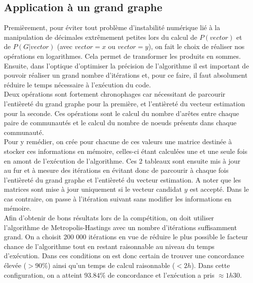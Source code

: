\documentclass[a4paper, 11pt]{article}
\begin{document}
\newpage

\subsection{Application à un grand graphe}
Premièrement, pour éviter tout problème d'instabilité numérique lié à la manipulation de décimales extrêmement petites lors du calcul de $P(vector)$ et de $P(G|vector)$ (avec $vector = x$ ou $vector = y$), on fait le choix de réaliser nos opérations en logarithmes. Cela permet de transformer les produits en sommes.\\

Ensuite, dans l'optique d'optimiser la précision de l'algorithme il est important de pouvoir réaliser un grand nombre d'itérations et, pour ce faire, il faut absolument réduire le temps nécessaire à l'exécution du code.\\

Deux opérations sont fortement chronophages car nécessitant de parcourir l'entièreté du grand graphe pour la première, et l'entièreté du vecteur estimation pour la seconde. Ces opérations sont  le calcul du nombre d'arêtes entre chaque paire de communautés et le calcul du nombre de noeuds présents dans chaque communauté.\\

Pour y remédier, on crée pour chacune de ces valeurs une matrice destinée à stocker ces informations en mémoire, celles-ci étant calculées une et une seule fois en amont de l'exécution de l'algorithme. Ces 2 tableaux sont ensuite mis à jour au fur et à mesure des itérations en évitant donc de parcourir à chaque fois l'entièreté du grand graphe et l'entièreté du vecteur estimation. A noter que les matrices sont mise à jour uniquement si le vecteur candidat $y$ est accepté. Dans le cas contraire, on passe à l'itération suivant sans modifier les informations en mémoire.\\

Afin d'obtenir de bons résultats lors de la compétition, on doit utiliser l'algorithme de Metropolis-Hastings avec un nombre d'itérations suffisamment grand. On a choisit 200 000 itérations en vue de réduire le plus possible le facteur chance de l'algorithme tout en restant raisonnable au niveau du temps d'exécution. Dans ces conditions on est donc certain de trouver une concordance élevée ($ >90\% $) ainsi qu'un temps de calcul raisonnable ($< 2h$). Dans cette configuration, on a atteint $93.84\%$ de concordance et l'exécution a pris $\approx 1h30$.\\

\newpage


\end{document}
